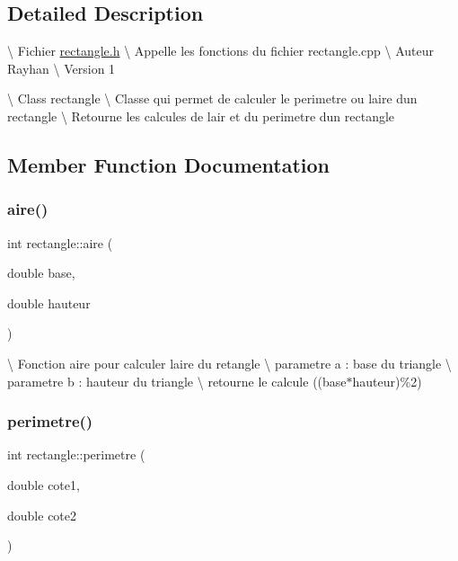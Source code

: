\subsection{Detailed Description}
\textbackslash{} Fichier \hyperlink{rectangle_8h_source}{rectangle.\+h} \textbackslash{} Appelle les fonctions du fichier rectangle.\+cpp \textbackslash{} Auteur Rayhan \textbackslash{} Version 1

\textbackslash{} Class rectangle \textbackslash{} Classe qui permet de calculer le perimetre ou l\textquotesingle{}aire d\textquotesingle{}un rectangle \textbackslash{} Retourne les calcules de l\textquotesingle{}air et du perimetre d\textquotesingle{}un rectangle 

\subsection{Member Function Documentation}
\mbox{\label{classrectangle_ac96948e7667ebe186603b671d373f449}} 
\subsubsection{\texorpdfstring{aire()}{aire()}}
{\footnotesize\ttfamily int rectangle\+::aire (\begin{DoxyParamCaption}\item[{double}]{base,  }\item[{double}]{hauteur }\end{DoxyParamCaption})}

\textbackslash{} Fonction aire pour calculer l\textquotesingle{}aire du retangle \textbackslash{} parametre a \+: base du triangle \textbackslash{} parametre b \+: hauteur du triangle \textbackslash{} retourne le calcule ((base$\ast$hauteur)\%2) \mbox{\label{classrectangle_a6de6e798ba0de4ca940ec2089a3bd774}} 
\subsubsection{\texorpdfstring{perimetre()}{perimetre()}}
{\footnotesize\ttfamily int rectangle\+::perimetre (\begin{DoxyParamCaption}\item[{double}]{cote1,  }\item[{double}]{cote2 }\end{DoxyParamCaption})}

